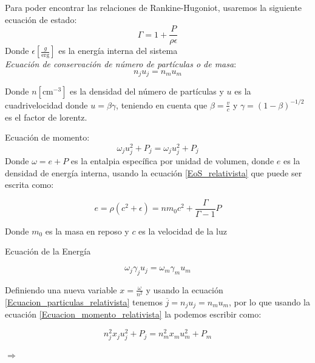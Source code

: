 \documentclass[12pt,a4paper]{book}
\begin{document}
Para poder encontrar las relaciones de Rankine-Hugoniot, usaremos la siguiente ecuación de estado:
\begin{equation}\label{EoS_relativista}
\Gamma = 1+\frac{P}{\rho \epsilon}
\end{equation}
Donde $\epsilon \left[ \frac{g}{\mathrm{erg}}\right]$ es la energía interna del sistema\\
\textit{Ecuación de conservación de número de partículas o de masa}:
\begin{equation}\label{Ecuacion_particulas_relativista}
n_j u_j = n_m u_m
\end{equation}

Donde $n \left[ \mathrm{cm}^{-3}\right]$ es la densidad del número de partículas y $u$ es la cuadrivelocidad donde $u=\beta \gamma$,
teniendo en cuenta que $\beta = \frac{v}{c}$ y $\gamma = \left( 1 - \beta \right)^{-1/2}$ es el factor de lorentz.

Ecuación de momento: 
\begin{equation}\label{Ecuacion_momento_relativista}
\omega_j u_{j}^{2}+P_j=\omega_j u_{j}^{2}+P_j
\end{equation}
Donde $\omega = e + P$ es la entalpia específica por unidad de volumen, donde $e$ es la densidad de energía interna, usando la ecuación \ref{EoS_relativista}  que puede ser escrita como:

\begin{equation}\label{Energia_densidad_fluido}
e = \rho \left( c^2+ \epsilon \right)= nm_{0}c^{2} + \frac{\Gamma}{\Gamma -1}P
\end{equation}

Donde $m_0$ es la masa en reposo y $c$ es la velocidad de la luz

Ecuación de la Energía

\begin{equation}\label{Ecuacion_energia_relativista}
\omega_j \gamma_j u_j=\omega_m \gamma_m u_m
\end{equation}

Definiendo una nueva variable $x=\frac{\omega}{n^{2}}$ y usando la ecuación \ref{Ecuacion_particulas_relativista} tenemos $\overline{j}=n_j u_j = n_m u_m$, por lo que usando  la ecuación \ref{Ecuacion_momento_relativista} la podemos escribir como:

\begin{equation*}
n_{j}^2 x_{j} u_{j}^{2} + P_{j}
=
n_{m}^2 x_{m} u_{m}^{2} + P_{m}
\end{equation*}

$\Rightarrow$
\end{document}
